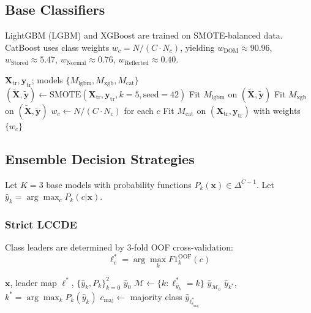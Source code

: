 \documentclass[conference]{IEEEtran}
\begin{document}
\subsection{Base Classifiers}

LightGBM (LGBM) and XGBoost are trained on SMOTE-balanced data.
CatBoost uses class weights $w_c = N/(C \cdot N_c)$, yielding
$w_{\text{DOM}} \approx 90.96$, $w_{\text{Stored}} \approx 5.47$,
$w_{\text{Normal}} \approx 0.76$, $w_{\text{Reflected}} \approx 0.40$.

\begin{algorithm}[t]
\caption{SMOTE Training Pipeline}
\label{alg:smote}
\begin{algorithmic}[1]
\REQUIRE $\mathbf{X}_{\text{tr}}, \mathbf{y}_{\text{tr}}$;
         models $\{M_{\text{lgbm}}, M_{\text{xgb}}, M_{\text{cat}}\}$
\STATE $(\tilde{\mathbf{X}}, \tilde{\mathbf{y}}) \leftarrow
  \text{SMOTE}(\mathbf{X}_{\text{tr}}, \mathbf{y}_{\text{tr}},
  k{=}5, \text{seed}{=}42)$
\STATE Fit $M_{\text{lgbm}}$ on $(\tilde{\mathbf{X}}, \tilde{\mathbf{y}})$
\STATE Fit $M_{\text{xgb}}$ on $(\tilde{\mathbf{X}}, \tilde{\mathbf{y}})$
\STATE $w_c \leftarrow N/(C \cdot N_c)$ for each $c$
\STATE Fit $M_{\text{cat}}$ on $(\mathbf{X}_{\text{tr}},\mathbf{y}_{\text{tr}})$
       with weights $\{w_c\}$
\end{algorithmic}
\end{algorithm}

\subsection{Ensemble Decision Strategies}

Let $K=3$ base models with probability functions
$P_k(\mathbf{x}) \in \Delta^{C-1}$. Let $\hat{y}_k = \arg\max_c P_k(c|\mathbf{x})$.

\subsubsection{Strict LCCDE}
Class leaders are determined by 3-fold OOF cross-validation:
\begin{equation}
  \ell^*_c = \arg\max_k F1_k^{\text{OOF}}(c)
  \label{eq:strict_lccde_leader}
\end{equation}

\begin{algorithm}[t]
\caption{Strict LCCDE Decision}
\label{alg:strict_lccde}
\begin{algorithmic}[1]
\REQUIRE $\mathbf{x}$, leader map $\boldsymbol{\ell}^*$,
         $\{\hat{y}_k, P_k\}_{k=0}^{2}$
  \RETURN $\hat{y}_0$
  \STATE $\mathcal{M} \leftarrow \{k : \ell^*_{\hat{y}_k} = k\}$
   \RETURN $\hat{y}_{\mathcal{M}_0}$
  \ELSE \RETURN $\hat{y}_{k^*}$, $k^* = \arg\max_k P_k(\hat{y}_k)$
  \ENDIF
\ELSE
  \STATE $c_{\text{maj}} \leftarrow$ majority class
  \RETURN $\hat{y}_{\ell^*_{c_{\text{maj}}}}$
\ENDIF
\end{algorithmic}
\end{algorithm}
\end{document}
